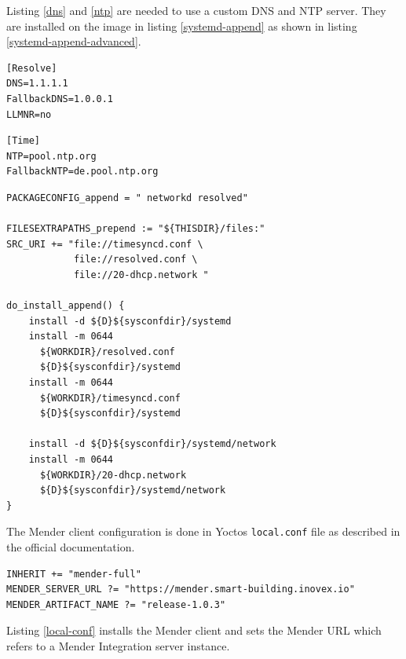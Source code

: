 Listing \ref{dns} and \ref{ntp} are needed to use a custom DNS and NTP server. They are installed on the image in listing \ref{systemd-append} as shown in listing \ref{systemd-append-advanced}.
\begin{code}
  \label{dns}
  \begin{verbatim}
[Resolve]
DNS=1.1.1.1
FallbackDNS=1.0.0.1
LLMNR=no
  \end{verbatim}
\end{code}
\begin{code}
  \label{ntp}
  \begin{verbatim}
[Time]
NTP=pool.ntp.org
FallbackNTP=de.pool.ntp.org
  \end{verbatim}
\end{code}
\begin{code}
  \label{systemd-append-advanced}
  \begin{verbatim}
PACKAGECONFIG_append = " networkd resolved"

FILESEXTRAPATHS_prepend := "${THISDIR}/files:"
SRC_URI += "file://timesyncd.conf \
            file://resolved.conf \
            file://20-dhcp.network "

do_install_append() {
    install -d ${D}${sysconfdir}/systemd
    install -m 0644
      ${WORKDIR}/resolved.conf
      ${D}${sysconfdir}/systemd
    install -m 0644
      ${WORKDIR}/timesyncd.conf
      ${D}${sysconfdir}/systemd

    install -d ${D}${sysconfdir}/systemd/network
    install -m 0644
      ${WORKDIR}/20-dhcp.network
      ${D}${sysconfdir}/systemd/network
}
  \end{verbatim}
\end{code}
The Mender client configuration is done in Yoctos \verb|local.conf| file as described in the official documentation.
\begin{code}
  \captionof{listing}{local.conf}
  \label{local-conf}
  \begin{verbatim}
INHERIT += "mender-full"
MENDER_SERVER_URL ?= "https://mender.smart-building.inovex.io"
MENDER_ARTIFACT_NAME ?= "release-1.0.3"
  \end{verbatim}
\end{code}
Listing \ref{local-conf} installs the Mender client and sets the Mender URL which refers to a Mender Integration server instance.

